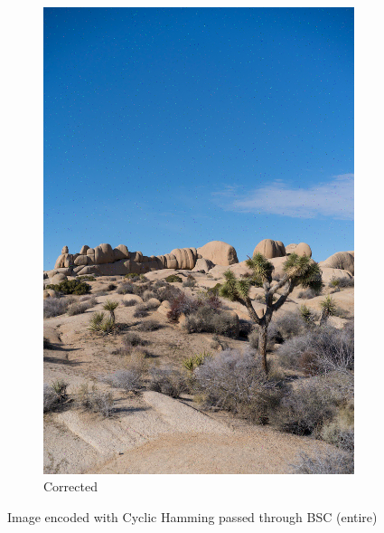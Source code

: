 \documentclass{article}
\begin{document}
\begin{figure}[htb]
\begin{subfigure}[b]{0.32\textwidth}
        \includegraphics[width=\textwidth]{../Result/Cyclic/15-11/cyclic-bsc-output-syndrome-corrected.png}
        \caption{Corrected}
        \label{fig:image-cyclic-bsc-syndrome-corrected}
    \end{subfigure}
       \caption{Image encoded with Cyclic Hamming passed through BSC (entire)}
       \label{fig:image-cyclic-bsc}
\end{figure}
\end{document}

